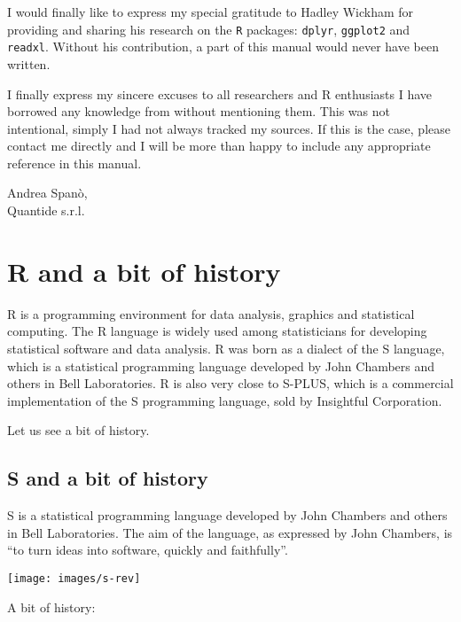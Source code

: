 \documentclass[]{book}
\begin{document}
I would finally like to express my special gratitude to Hadley Wickham
for providing and sharing his research on the \texttt{R} packages:
\texttt{dplyr}, \texttt{ggplot2} and \texttt{readxl}. Without his
contribution, a part of this manual would never have been written.

I finally express my sincere excuses to all researchers and R
enthusiasts I have borrowed any knowledge from without mentioning them.
This was not intentional, simply I had not always tracked my sources. If
this is the case, please contact me directly and I will be more than
happy to include any appropriate reference in this manual.

Andrea Spanò,\\
Quantide s.r.l.

\chapter{R and a bit of history}\label{r-and-a-bit-of-history}

R is a programming environment for data analysis, graphics and
statistical computing. The R language is widely used among statisticians
for developing statistical software and data analysis. R was born as a
dialect of the S language, which is a statistical programming language
developed by John Chambers and others in Bell Laboratories. R is also
very close to S-PLUS, which is a commercial implementation of the S
programming language, sold by Insightful Corporation.

Let us see a bit of history.

\section{S and a bit of history}\label{s-and-a-bit-of-history}

S is a statistical programming language developed by John Chambers and
others in Bell Laboratories. The aim of the language, as expressed by
John Chambers, is ``to turn ideas into software, quickly and
faithfully''.

\begin{center}\texttt{[image: images/s-rev]} \end{center}

A bit of history:
\end{document}
